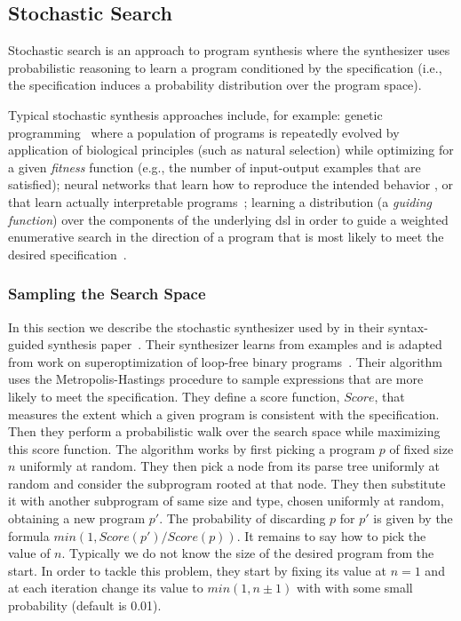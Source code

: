 \subsection{Stochastic Search}
\label{sec:stochastic-search}

Stochastic search is an approach to program synthesis where the synthesizer uses
probabilistic reasoning to learn a program conditioned by the specification
(i.e., the specification induces a probability distribution over the program
space).

Typical stochastic synthesis approaches include, for example:
genetic programming~\cite{Weimer:2009:AFP} where a population of programs is
repeatedly evolved by application of biological principles (such as natural
selection) while optimizing for a given \textit{fitness} function (e.g., the
number of input-output examples that are satisfied);
neural networks that learn how to reproduce the intended
behavior%
, or that learn actually interpretable
programs~\cite{Parisotto:2016:NPS};
learning a distribution (a \textit{guiding function}) over the components of
the underlying \gls{dsl} in order to guide a weighted enumerative search in the
direction of a program that is most likely to meet the desired
specification~\cite{Balog:2017:DC}. %

\subsubsection{Sampling the Search Space}
\label{sec:sampling}

In this section we describe the stochastic synthesizer used by
\citeauthor{Alur:sygus:2013} in their syntax-guided synthesis
paper~\cite{Alur:sygus:2013}.
Their synthesizer learns from examples and is adapted from work on
superoptimization of loop-free binary programs~\cite{Schkufza:2013:SS}.
Their algorithm uses the Metropolis-Hastings procedure to sample expressions
that are more likely to meet the specification.
They define a score function, $Score$, that measures the extent which a given
program is consistent with the specification.
Then they perform a probabilistic walk over the search space while maximizing
this score function.
The algorithm works by first picking a program $p$ of fixed size $n$ uniformly
at random.
They then pick a node from its parse tree uniformly at random and consider the
subprogram rooted at that node.
They then substitute it with another subprogram of same size and type, chosen
uniformly at random, obtaining a new program $p'$.
The probability of discarding $p$ for $p'$ is given by the formula $min(1,
Score(p')/Score(p))$.
It remains to say how to pick the value of $n$.
Typically we do not know the size of the desired program from the start.
In order to tackle this problem, they start by fixing its value at $n = 1$ and
at each iteration change its value to $min(1, n\pm{}1)$ with with some small
probability (default is 0.01).
